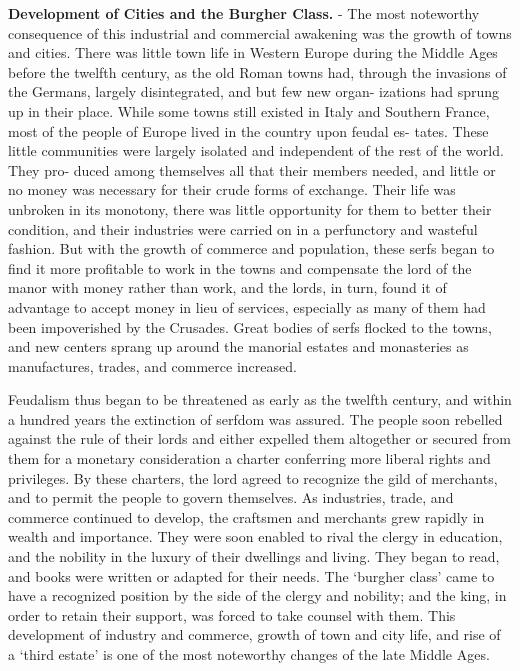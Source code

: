 \documentclass[]{book}
\begin{document}
\textbf{Development of Cities and the Burgher Class.} - The most noteworthy consequence of this industrial and commercial awakening was the growth of towns and cities. There was little town life in Western Europe during the Middle Ages before the twelfth century, as the old Roman towns had, through the invasions of the Germans, largely disintegrated, and but few new organ- izations had sprung up in their place. While some towns still existed in Italy and Southern France, most of the people of Europe lived in the country upon feudal es- tates. These little communities were largely isolated and independent of the rest of the world. They pro- duced among themselves all that their members needed, and little or no money was necessary for their crude forms of exchange. Their life was unbroken in its monotony, there was little opportunity for them to better their condition, and their industries were carried on in a perfunctory and wasteful fashion. But with the growth of commerce and population, these serfs began to find it more profitable to work in the towns and compensate the lord of the manor with money rather than work, and the lords, in turn, found it of advantage to accept money in lieu of services, especially as many of them had been impoverished by the Crusades. Great bodies of serfs flocked to the towns, and new centers sprang up around the manorial estates and monasteries as manufactures, trades, and commerce increased.

Feudalism thus began to be threatened as early as the twelfth century, and within a hundred years the extinction of serfdom was assured. The people soon rebelled against the rule of their lords and either expelled them altogether or secured from them for a monetary consideration a charter conferring more liberal rights and privileges. By these charters, the lord agreed to recognize the gild of merchants, and to permit the people to govern themselves. As industries, trade, and commerce continued to develop, the craftsmen and merchants grew rapidly in wealth and importance. They were soon enabled to rival the clergy in education, and the nobility in the luxury of their dwellings and living. They began to read, and books were written or adapted for their needs. The `burgher class' came to have a recognized position by the side of the clergy and nobility; and the king, in order to retain their support, was forced to take counsel with them. This development of industry and commerce, growth of town and city life, and rise of a `third estate' is one of the most noteworthy changes of the late Middle Ages.
\end{document}
